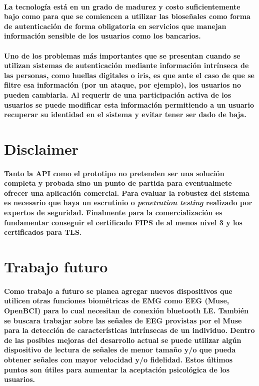 \documentclass{article}
\begin{document}
\paragraph{
La tecnología está en un grado de madurez y costo suficientemente bajo como para que se comiencen a utilizar las bioseñales como forma de autenticación de forma obligatoria en servicios que manejan información sensible de los usuarios como los bancarios.
}
\paragraph{
Uno de los problemas más importantes que se presentan cuando se utilizan sistemas de autenticación mediante información intrínseca de las personas, como huellas digitales o iris, es que ante el caso de que se filtre esa información (por un ataque, por ejemplo), los usuarios no pueden cambiarla. Al requerir de una participación activa de los usuarios se puede modificar esta información permitiendo a un usuario recuperar su identidad en el sistema y evitar tener ser dado de baja.
}
\section{Disclaimer}
\paragraph{
Tanto la API como el prototipo no pretenden ser una solución completa y probada sino un punto de partida para eventualmete ofrecer una aplicación comercial. Para evaluar la robustez del sistema es necesario que haya un escrutinio o \textit{penetration testing} realizado por expertos de seguridad. Finalmente para la comercialización es fundamentar conseguir el certificado FIPS de al menos nivel 3 y los certificados para TLS.
}
\section{Trabajo futuro}
\paragraph{
Como trabajo a futuro se planea agregar nuevos dispositivos que utilicen otras funciones biométricas de EMG como EEG (Muse, OpenBCI) para lo cual necesitan de conexión bluetooth LE. También se buscara trabajar sobre las señales de EEG provistas por el Muse para la detección de características intrínsecas de un individuo.
Dentro de las posibles mejoras del desarrollo actual se puede utilizar algún dispositivo de lectura de señales de menor tamaño y/o que pueda obtener señales con mayor velocidad y/o fidelidad. Estos últimos puntos son útiles para aumentar la aceptación psicológica de los usuarios.
}
\end{document}
